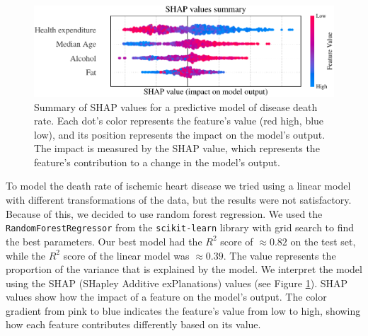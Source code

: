 

\begin{figure}[ht]
    \vskip 0.2in
    \begin{center}
    \centerline{\includegraphics[width=\columnwidth]{fig/shap_values_summary.pdf}}
    \caption{Summary of SHAP values for a predictive model of disease death rate. 
    Each dot's color represents the feature's value (red high, blue low), and its position represents the impact on the model's output.
    The impact is measured by the SHAP value, which represents the feature's contribution to a change in the model's output.}
    \label{shap_values}
    \end{center}
    \vskip -0.2in
\end{figure}

To model the death rate of ischemic heart disease we tried using a linear model with different transformations of the data, but the results were not satisfactory.
Because of this, we decided to use random forest regression. 
We used the \texttt{RandomForestRegressor} from the \texttt{scikit-learn} library \citep{scikit-learn} with grid search to find the best parameters. Our best model had the 
$R^2$ score of $\approx0.82$ on the test set, while the $R^2$ score of the linear model was $\approx0.39$. The value represents the proportion of the variance that 
is explained by the model. We interpret the model using the SHAP (SHapley Additive exPlanations) values \citep{NIPS2017_7062} (see Figure \ref{shap_values}). SHAP values 
show how the impact of a feature on the model's output. The color gradient from pink to blue indicates the feature's value from low to high, 
showing how each feature contributes differently based on its value.

